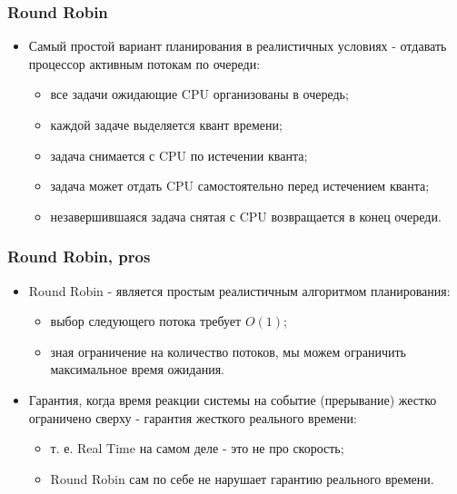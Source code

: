 \begin{frame}
\frametitle{Round Robin}
\begin{itemize}
  \item Самый простой вариант планирования в реалистичных условиях - отдавать
  процессор активным потокам по очереди:
  \begin{itemize}
    \item все задачи ожидающие CPU организованы в очередь;
    \item каждой задаче выделяется квант времени;
    \item задача снимается с CPU по истечении кванта;
    \item задача может отдать CPU самостоятельно перед истечением кванта;
    \item незавершившаяся задача снятая с CPU возвращается в конец очереди.
  \end{itemize}
\end{itemize}
\end{frame}

\begin{frame}
\frametitle{Round Robin, pros}
\begin{itemize}
  \item Round Robin - является простым реалистичным алгоритмом планирования:
  \begin{itemize}
    \item выбор следующего потока требует $O\left(1\right)$;
    \item зная ограничение на количество потоков, мы можем ограничить
    максимальное время ожидания.
  \end{itemize}
  \item Гарантия, когда время реакции системы на событие (прерывание) жестко
  ограничено сверху - гарантия жесткого реального времени:
  \begin{itemize}
    \item т. е. Real Time на самом деле - это не про скорость;
    \item Round Robin сам по себе не нарушает гарантию реального времени.
  \end{itemize}
\end{itemize}
\end{frame}

